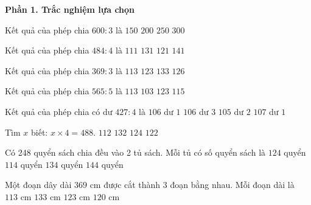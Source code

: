 \textbf{Phần 1. Trắc nghiệm lựa chọn}

\begin{ex} %
Kết quả của phép chia $600 : 3$ là
\choice
{$150$}
{\True $200$}
{$250$}
{$300$}
\end{ex}

\begin{ex} %
Kết quả của phép chia $484 : 4$ là
\choice
{$111$}
{$131$}
{\True $121$}
{$141$}
\end{ex}

\begin{ex} %
Kết quả của phép chia $369 : 3$ là
\choice
{$113$}
{\True $123$}
{$133$}
{$126$}
\end{ex}

\begin{ex} %
Kết quả của phép chia $565 : 5$ là
\choice
{\True $113$}
{$103$}
{$123$}
{$115$}
\end{ex}

\begin{ex} %
Kết quả của phép chia có dư $427 : 4$ là
\choice
{$106$ dư $1$}
{\True $106$ dư $3$}
{$105$ dư $2$}
{$107$ dư $1$}
\end{ex}

\begin{ex} %
Tìm $x$ biết: $x \times 4 = 488$.
\choice
{$112$}
{$132$}
{$124$}
{\True $122$}
\end{ex}

\begin{ex} %
Có 248 quyển sách chia đều vào 2 tủ sách. Mỗi tủ có số quyển sách là
\choice
{\True $124$ quyển}
{$114$ quyển}
{$134$ quyển}
{$144$ quyển}
\end{ex}

\begin{ex} %
Một đoạn dây dài $369\text{ cm}$ được cắt thành 3 đoạn bằng nhau. Mỗi đoạn dài là
\choice
{$113\text{ cm}$}
{$133\text{ cm}$}
{\True $123\text{ cm}$}
{$120\text{ cm}$}
\end{ex}

